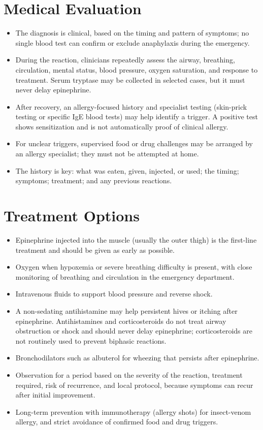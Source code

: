 \section*{Medical Evaluation}
\begin{itemize}
  \item The diagnosis is clinical, based on the timing and pattern of symptoms; no single blood test can confirm or exclude anaphylaxis during the emergency.
  \item During the reaction, clinicians repeatedly assess the airway, breathing, circulation, mental status, blood pressure, oxygen saturation, and response to treatment. Serum tryptase may be collected in selected cases, but it must never delay epinephrine.
  \item After recovery, an allergy-focused history and specialist testing (skin-prick testing or specific IgE blood tests) may help identify a trigger. A positive test shows sensitization and is not automatically proof of clinical allergy.
  \item For unclear triggers, supervised food or drug challenges may be arranged by an allergy specialist; they must not be attempted at home.
  \item The history is key: what was eaten, given, injected, or used; the timing; symptoms; treatment; and any previous reactions.
\end{itemize}

\section*{Treatment Options}
\begin{itemize}
  \item Epinephrine injected into the muscle (usually the outer thigh) is the first-line treatment and should be given as early as possible.
  \item Oxygen when hypoxemia or severe breathing difficulty is present, with close monitoring of breathing and circulation in the emergency department.
  \item Intravenous fluids to support blood pressure and reverse shock.
  \item A non-sedating antihistamine may help persistent hives or itching after epinephrine. Antihistamines and corticosteroids do not treat airway obstruction or shock and should never delay epinephrine; corticosteroids are not routinely used to prevent biphasic reactions.
  \item Bronchodilators such as albuterol for wheezing that persists after epinephrine.
  \item Observation for a period based on the severity of the reaction, treatment required, risk of recurrence, and local protocol, because symptoms can recur after initial improvement.
  \item Long-term prevention with immunotherapy (allergy shots) for insect-venom allergy, and strict avoidance of confirmed food and drug triggers.
\end{itemize}


